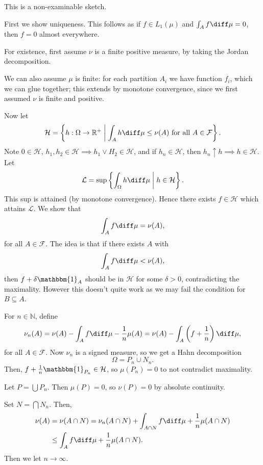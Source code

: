 \documentclass[12pt]{article}
\begin{document}
\begin{proofbox}
	This is a non-examinable sketch.

	First we show uniqueness. This follows as if $f \in L_1(\mu)$ and $\int_A f \diff \mu = 0$, then $f = 0$ almost everywhere.

	For existence, first assume $\nu$ is a finite positive measure, by taking the Jordan decomposition.

	We can also assume $\mu$ is finite: for each partition $A_i$ we have function $f_i$, which we can glue together; this extends by monotone convergence, since we first assumed $\nu$ is finite and positive.

	Now let
	\[
		\mathcal{H} = \left\{h : \Omega \to \mathbb{R}^+ \biggm| \int_A h \diff \mu \leq \nu(A) \text{ for all } A \in \mathcal{F}\right\}.
	\]
	Note $0 \in \mathcal{H}$, $h_1, h_2 \in \mathcal{H} \implies h_1  \vee H_2 \in \mathcal{H}$, and if $h_n \in \mathcal{H}$, then $h_n \uparrow h \implies h \in \mathcal{H}$. Let
	\[
		\mathcal{L} = \sup \left\{ \int_{\Omega} h \diff \mu \biggm| h \in \mathcal{H} \right\}.
	\]
	This sup is attained (by monotone convergence). Hence there exists $f \in \mathcal{H}$ which attains $\mathcal{L}$. We show that
	\[
	\int_A f \diff \mu = \nu(A),
	\]
	for all $A \in \mathcal{F}$. The idea is that if there exists $A$ with
	\[
	\int_A f \diff \mu < \nu(A),
	\]
	then $f + \delta \mathbbm{1}_{A}$ should be in $\mathcal{H}$ for some $\delta > 0$, contradicting the maximality. However this doesn't quite work as we may fail the condition for $B \subseteq A$.

	For $n \in \mathbb{N}$, define
	\[
	\nu_n(A) = \nu(A) - \int_A f \diff \mu - \frac{1}{n} \mu(A) = \nu(A) - \int_A \left(f + \frac{1}{n} \right) \diff \mu,
	\]
	for all $A \in \mathcal{F}$. Now $\nu_n$ is a signed measure, so we get a Hahn decomposition
	\[
	\Omega = P_n \cup N_n.
	\]
	Then, $f + \frac{1}{n} \mathbbm{1}_{P_n} \in \mathcal{H}$, so $\mu(P_n) = 0$ to not contradict maximality.

	Let $P = \bigcup P_n$. Then $\mu(P) = 0$, so $\nu(P) = 0$ by absolute continuity.

	Set $N = \bigcap N_n$. Then,
	\begin{align*}
		\nu(A) &= \nu(A \cap N) = \nu_n(A \cap N) + \int_{A \cap N}  f \diff \mu + \frac{1}{n} \mu(A \cap N) \\
		       &\leq \int_A f \diff \mu + \frac{1}{n} \mu(A \cap N).
	\end{align*}
	Then we let $n \to \infty$.
\end{proofbox}
\end{document}
